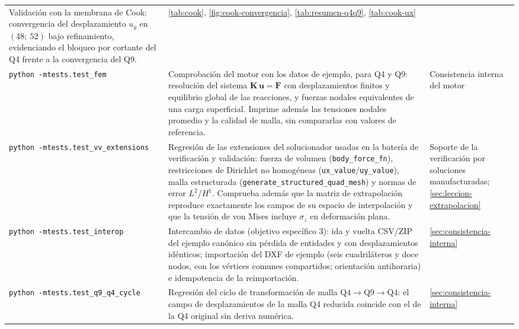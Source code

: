 {\begin{longtable}{@{}>{\footnotesize\raggedright\arraybackslash}p{4.3cm} >{\footnotesize\raggedright\arraybackslash}p{5.1cm} >{\footnotesize\raggedright\arraybackslash}p{4.1cm}@{}}
Validación con la membrana de Cook: convergencia del desplazamiento $u_y$ en $(48;\ 52)$ bajo refinamiento, evidenciando el bloqueo por cortante del Q4 frente a la convergencia del Q9. &
\autoref{tab:cook}, \autoref{fig:cook-convergencia}, \autoref{tab:resumen-q4q9}, \autoref{tab:cook-ux} \\
\addlinespace
\texttt{python -m}\newline\texttt{tests.test\_fem} &
Comprobación del motor con los datos de ejemplo, para Q4 y Q9: resolución del sistema $\bm{K}\,\bm{u}=\bm{F}$ con desplazamientos finitos y equilibrio global de las reacciones, y fuerzas nodales equivalentes de una carga superficial. Imprime además las tensiones nodales promedio y la calidad de malla, sin compararlas con valores de referencia. &
Consistencia interna del motor \\
\addlinespace
\texttt{python -m}\newline\texttt{tests.test\_vv\_extensions} &
Regresión de las extensiones del solucionador usadas en la batería de verificación y validación: fuerza de volumen (\texttt{body\_force\_fn}), restricciones de Dirichlet no homogéneas (\texttt{ux\_value}/\texttt{uy\_value}), malla estructurada (\texttt{generate\_structured\_quad\_mesh}) y normas de error $L^2$/$H^1$. Comprueba además que la matriz de extrapolación reproduce exactamente los campos de su espacio de interpolación y que la tensión de von Mises incluye $\sigma_z$ en deformación plana. &
Soporte de la verificación por soluciones manufacturadas; \autoref{sec:leccion-extrapolacion} \\
\addlinespace
\texttt{python -m}\newline\texttt{tests.test\_interop} &
Intercambio de datos (objetivo específico 3): ida y vuelta CSV/ZIP del ejemplo canónico sin pérdida de entidades y con desplazamientos idénticos; importación del DXF de ejemplo (seis cuadriláteros y doce nodos, con los vértices comunes compartidos; orientación antihoraria) e idempotencia de la reimportación. &
\autoref{sec:consistencia-interna} \\
\addlinespace
\texttt{python -m}\newline\texttt{tests.test\_q9\_q4\_cycle} &
Regresión del ciclo de transformación de malla $\text{Q4}\rightarrow\text{Q9}\rightarrow\text{Q4}$: el campo de desplazamientos de la malla Q4 reducida coincide con el de la Q4 original sin deriva numérica. &
\autoref{sec:consistencia-interna} \\
\end{longtable}}

